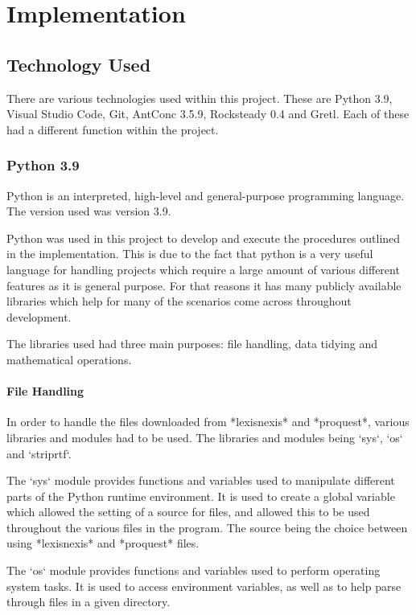 
\chapter{Implementation}

\section{Technology Used}

There are various technologies used within this project. These are Python 3.9, Visual Studio Code, Git, AntConc 3.5.9, Rocksteady 0.4 and Gretl. Each of these had a different function within the project.

\subsection{Python 3.9}

Python is an interpreted, high-level and general-purpose programming language. The version used was version 3.9. 

Python was used in this project to develop and execute the procedures outlined in the implementation. This is due to the fact that python is a very useful language for handling projects which require a large amount of various different features as it is general purpose. For that reasons it has many publicly available libraries which help for many of the scenarios come across throughout development.

The libraries used had three main purposes: file handling, data tidying and mathematical operations.

\subsubsection{File Handling}

In order to handle the files downloaded from *lexisnexis* and *proquest*, various libraries and modules had to be used. The libraries and modules being `sys`, `os` and `striprtf`.

The `sys` module provides functions and variables used to manipulate different parts of the Python runtime environment. It is used to create a global variable which allowed the setting of a source for files, and allowed this to be used throughout the various files in the program. The source being the choice between using *lexisnexis* and *proquest* files.

The `os` module provides functions and variables used to perform operating system tasks. It is used to access environment variables, as well as to help parse through files in a given directory.

